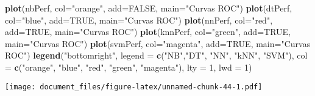 \documentclass[]{article}
\newenvironment{Shaded}{\begin{snugshade}}{\end{snugshade}}
\newcommand{\DataTypeTok}[1]{\textcolor[rgb]{0.13,0.29,0.53}{#1}}
\newcommand{\DecValTok}[1]{\textcolor[rgb]{0.00,0.00,0.81}{#1}}
\newcommand{\KeywordTok}[1]{\textcolor[rgb]{0.13,0.29,0.53}{\textbf{#1}}}
\newcommand{\NormalTok}[1]{#1}
\newcommand{\OtherTok}[1]{\textcolor[rgb]{0.56,0.35,0.01}{#1}}
\newcommand{\StringTok}[1]{\textcolor[rgb]{0.31,0.60,0.02}{#1}}
\begin{document}
\begin{Shaded}
\begin{Highlighting}[]
\KeywordTok{plot}\NormalTok{(nbPerf, }\DataTypeTok{col=}\StringTok{"orange"}\NormalTok{, }\DataTypeTok{add=}\OtherTok{FALSE}\NormalTok{, }\DataTypeTok{main=}\StringTok{"Curvas ROC"}\NormalTok{)}
\KeywordTok{plot}\NormalTok{(dtPerf, }\DataTypeTok{col=}\StringTok{"blue"}\NormalTok{, }\DataTypeTok{add=}\OtherTok{TRUE}\NormalTok{, }\DataTypeTok{main=}\StringTok{"Curvas ROC"}\NormalTok{)}
\KeywordTok{plot}\NormalTok{(nnPerf, }\DataTypeTok{col=}\StringTok{"red"}\NormalTok{, }\DataTypeTok{add=}\OtherTok{TRUE}\NormalTok{, }\DataTypeTok{main=}\StringTok{"Curvas ROC"}\NormalTok{)}
\KeywordTok{plot}\NormalTok{(knnPerf, }\DataTypeTok{col=}\StringTok{"green"}\NormalTok{, }\DataTypeTok{add=}\OtherTok{TRUE}\NormalTok{, }\DataTypeTok{main=}\StringTok{"Curvas ROC"}\NormalTok{)}
\KeywordTok{plot}\NormalTok{(svmPerf, }\DataTypeTok{col=}\StringTok{"magenta"}\NormalTok{, }\DataTypeTok{add=}\OtherTok{TRUE}\NormalTok{, }\DataTypeTok{main=}\StringTok{"Curvas ROC"}\NormalTok{)}
\KeywordTok{legend}\NormalTok{(}\StringTok{"bottomright"}\NormalTok{, }
       \DataTypeTok{legend =} \KeywordTok{c}\NormalTok{(}\StringTok{"NB"}\NormalTok{,}\StringTok{"DT"}\NormalTok{, }\StringTok{"NN"}\NormalTok{, }\StringTok{"kNN"}\NormalTok{, }\StringTok{"SVM"}\NormalTok{), }
       \DataTypeTok{col =} \KeywordTok{c}\NormalTok{(}\StringTok{"orange"}\NormalTok{, }\StringTok{"blue"}\NormalTok{, }\StringTok{"red"}\NormalTok{, }\StringTok{"green"}\NormalTok{, }\StringTok{"magenta"}\NormalTok{), }
       \DataTypeTok{lty =} \DecValTok{1}\NormalTok{, }\DataTypeTok{lwd =} \DecValTok{1}\NormalTok{)}
\end{Highlighting}
\end{Shaded}

\texttt{[image: document\_files/figure-latex/unnamed-chunk-44-1.pdf]}
\end{document}
